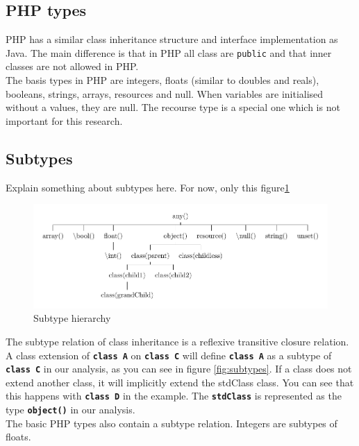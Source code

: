 \documentclass[../main.tex]{subfiles}
\begin{document}
    \subsection{PHP types}
    PHP has a similar class inheritance structure and interface implementation as Java.
    The main difference is that in PHP all class are \texttt{public} and that inner classes are not allowed in PHP. 
    \\
    The basis types in PHP are integers, floats (similar to doubles and reals), booleans, strings, arrays, resources and null.
    When variables are initialised without a values, they are null. The recourse type is a special one which is not important for this research.
 
    \subsection{Subtypes}
    
    Explain something about subtypes here. For now, only this figure\ref{fig:subtypeTree}

    \begin{figure}[H]
        \includegraphics{Diagrams/Subtypes.pdf}
        \caption{Subtype hierarchy}
        \label{fig:subtypeTree}
    \end{figure}

    The subtype relation of class inheritance is a \gls{reflexive transitive closure} relation.
    A class extension of \textbf{\texttt{class A}} on \textbf{\texttt{class C}} will define \textbf{\texttt{class A}} as a subtype of \textbf{\texttt{class C}} in our analysis, as you can see in figure \ref{fig:subtypes}.
    If a class does not extend another class, it will implicitly extend the \gls{stdClass} class.
    You can see that this happens with \textbf{\texttt{class D}} in the example.
    The \textbf{\texttt{stdClass}} is represented as the type \textbf{\texttt{object()}} in our analysis.
    \\
    The basic PHP types also contain a subtype relation.
    Integers are subtypes of floats.
 
\end{document}
